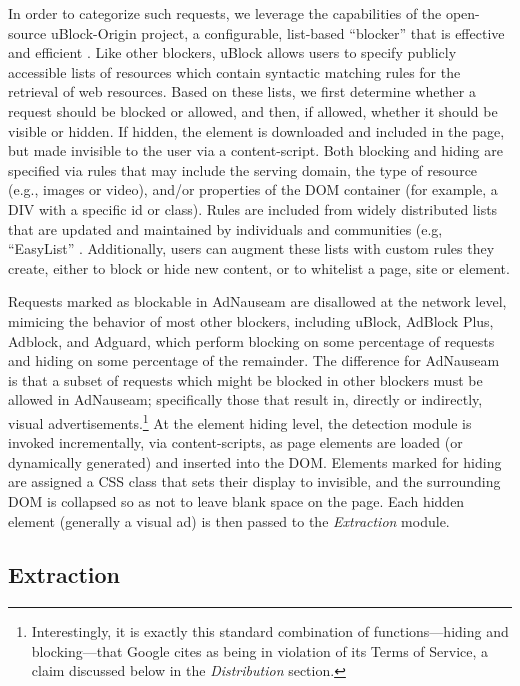 \documentclass[conference]{IEEEtran}
\begin{document}
In order to categorize such requests, we leverage the capabilities of the open-source uBlock-Origin \cite{Gorhill} project, a configurable, list-based “blocker” that is effective and efficient \cite{Wills}. Like other blockers, uBlock allows users to specify publicly accessible lists of resources which contain syntactic matching rules for the retrieval of web resources. Based on these lists, we first determine whether a request should be blocked or allowed, and then, if allowed, whether it should be visible or hidden. If hidden, the element is downloaded and included in the page, but made invisible to the user via a content-script. Both blocking and hiding are specified via rules that may include the serving domain, the type of resource (e.g., images or video), and/or properties of the DOM container (for example, a DIV with a specific id or class). Rules are included from widely distributed lists that are updated and maintained by individuals and communities (e.g, “EasyList” \cite{EasyList}. Additionally, users can augment these lists with custom rules they create, either to block or hide new content, or to whitelist a page, site or element.

Requests marked as blockable in AdNauseam are disallowed at the network level, mimicing the behavior of most other blockers, including uBlock, AdBlock Plus, Adblock, and Adguard, which perform blocking on some percentage of requests and hiding on some percentage of the remainder. The difference for AdNauseam is that a subset of requests which might be blocked in other blockers must be allowed in AdNauseam; specifically those that result in, directly or indirectly, visual advertisements.\footnote{Interestingly, it is exactly this standard combination of functions---hiding and blocking---that Google cites as being in violation of its Terms of Service, a claim discussed below in the \emph{Distribution} section.} At the element hiding level, the detection module is invoked incrementally, via content-scripts, as page elements are loaded (or dynamically generated) and inserted into the DOM. Elements marked for hiding are assigned a CSS class that sets their display to invisible, and the surrounding DOM is collapsed so as not to leave blank space on the page. Each hidden element (generally a visual ad) is then passed to the \emph{Extraction} module.


\subsection{Extraction}
\end{document}
